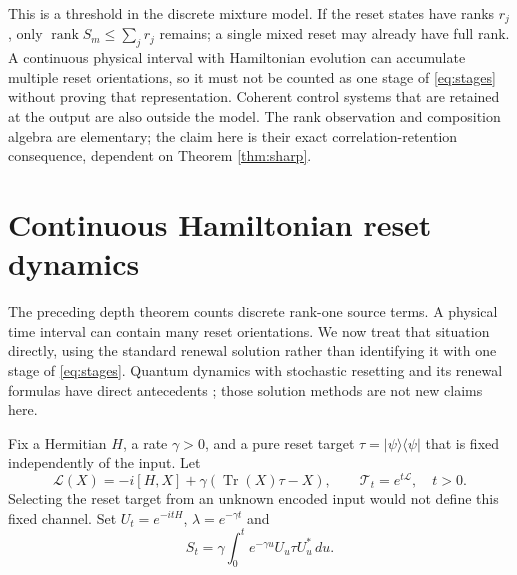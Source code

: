 \documentclass[11pt]{article}
\newcommand{\Tr}{\operatorname{Tr}}
\newcommand{\ket}[1]{|#1\rangle}
\newcommand{\bra}[1]{\langle#1|}
\DeclareMathOperator{\rank}{rank}
\begin{document}
This is a threshold in the discrete mixture model. If the reset states have ranks $r_j$, only $\rank S_m\le\sum_jr_j$ remains; a single mixed reset may already have full rank. A continuous physical interval with Hamiltonian evolution can accumulate multiple reset orientations, so it must not be counted as one stage of \eqref{eq:stages} without proving that representation. Coherent control systems that are retained at the output are also outside the model. The rank observation and composition algebra are elementary; the claim here is their exact correlation-retention consequence, dependent on Theorem \ref{thm:sharp}.

\section{Continuous Hamiltonian reset dynamics}
The preceding depth theorem counts discrete rank-one source terms. A physical time interval can contain many reset orientations. We now treat that situation directly, using the standard renewal solution rather than identifying it with one stage of \eqref{eq:stages}. Quantum dynamics with stochastic resetting and its renewal formulas have direct antecedents \cite{mukherjee,rose}; those solution methods are not new claims here.

Fix a Hermitian $H$, a rate $\gamma>0$, and a pure reset target $\tau=\ket\psi\bra\psi$ that is fixed independently of the input. Let
\[
 \mathcal L(X)=-i[H,X]+\gamma(\Tr(X)\tau-X),\qquad \mathcal T_t=e^{t\mathcal L},\quad t>0.
\]
Selecting the reset target from an unknown encoded input would not define this fixed channel. Set $U_t=e^{-itH}$, $\lambda=e^{-\gamma t}$ and
\begin{equation}\label{eq:gramian}
 S_t=\gamma\int_0^t e^{-\gamma u}U_u\tau U_u^*\,du.
\end{equation}
\end{document}
